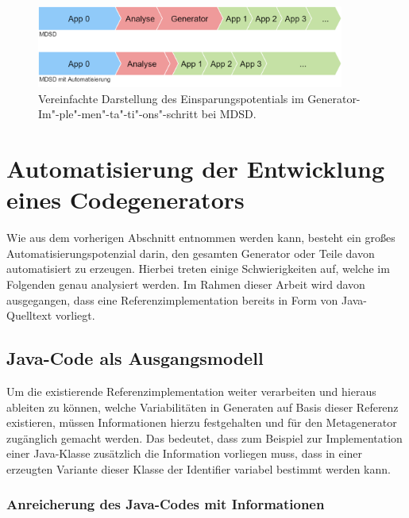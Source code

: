 \documentclass[12pt,oneside,a4paper,parskip]{scrbook}
\begin{document}
\begin{figure}[htbp]
\centering
\includegraphics[width=0.9\textwidth]{bilder/vergleich_2}
\caption{Vereinfachte Darstellung des Einsparungspotentials im Generator-Im"-ple"-men"-ta"-ti"-ons"-schritt bei MDSD.}
\label{fig:vgl2}
\end{figure}


\section{Automatisierung der Entwicklung eines Codegenerators}

Wie aus dem vorherigen Abschnitt entnommen werden kann, besteht ein großes Automatisierungspotenzial darin, den gesamten Generator oder Teile davon automatisiert zu erzeugen. Hierbei treten einige Schwierigkeiten auf, welche im Folgenden genau analysiert werden. Im Rahmen dieser Arbeit wird davon ausgegangen, dass eine Referenzimplementation bereits in Form von Java-Quelltext vorliegt.

\subsection{Java-Code als Ausgangsmodell}

Um die existierende Referenzimplementation weiter verarbeiten und hieraus ableiten zu können, welche Variabilitäten in Generaten auf Basis dieser Referenz existieren, müssen Informationen hierzu festgehalten und für den Metagenerator zugänglich gemacht werden. Das bedeutet, dass zum Beispiel zur Implementation einer Java-Klasse zusätzlich die Information vorliegen muss, dass in einer erzeugten Variante dieser Klasse der Identifier variabel bestimmt werden kann.

\subsubsection{Anreicherung des Java-Codes mit Informationen}
\end{document}
